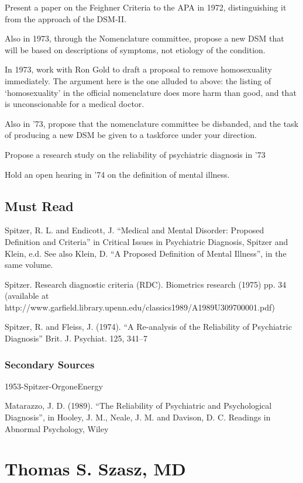 Present a paper on the Feighner Criteria to the APA in 1972, distinguishing it from the approach of the DSM-II.

Also in 1973, through the Nomenclature committee, propose a new DSM that will be based on descriptions of symptoms, not etiology of the condition.

In 1973, work with Ron Gold to draft a proposal to remove homosexuality immediately. The argument here is the one alluded to above: the listing of `homosexuality' in the official nomenclature does more harm than good, and that is unconscionable for a medical doctor.

Also in '73, propose that the nomenclature committee be disbanded, and the task of producing a new DSM be given to a taskforce under your direction.

Propose a research study on the reliability of psychiatric diagnosis in '73

Hold an open hearing in '74 on the definition of mental illness.

\section{Must Read}
\label{mustread}

Spitzer, R. L. and Endicott, J. ``Medical and Mental Disorder: Proposed Definition and Criteria'' in Critical Issues in Psychiatric Diagnosis, Spitzer and Klein, e.d. See also Klein, D. ``A Proposed Definition of Mental Illness'', in the same volume.

Spitzer. Research diagnostic criteria (RDC). Biometrics research (1975) pp. 34 (available at http:\slash \slash www.garfield.library.upenn.edu\slash classics1989\slash A1989U309700001.pdf)

Spitzer, R. and Fleiss, J. (1974). ``A Re-analysis of the Reliability of Psychiatric Diagnosis'' Brit. J. Psychiat. 125, 341--7

\subsection{Secondary Sources}
\label{secondarysources}

1953-Spitzer-OrgoneEnergy

Matarazzo, J. D. (1989). ``The Reliability of Psychiatric and Psychological Diagnosis'', in Hooley, J. M., Neale, J. M. and Davison, D. C. Readings in Abnormal Psychology, Wiley

\chapter{Thomas S. Szasz, MD}
\label{thomass.szaszmd}

